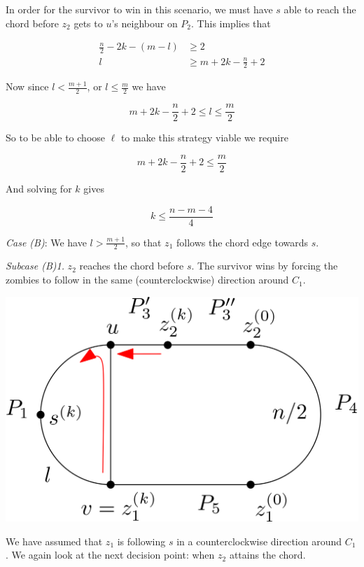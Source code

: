 \documentclass[letterpaper, 10pt]{article}
\begin{document}
\begin{enumerate}
       In order for the survivor to win in this scenario, we must have $s$ able to
       reach the chord before $z_2$ gets to $u$'s neighbour on $P_2$. This implies that

       \begin{align*}
        \frac{n}{2} - 2k - (m-l) & \geq 2                        \\
        l                        & \geq m + 2k - \frac{n}{2} + 2
       \end{align*}

       Now since $l < \frac{m+1}{2}$, or $l \leq \frac{m}{2}$ we have

       \[ m+2k-\frac{n}{2} +2 \leq l \leq \frac{m}{2} \]

       So to be able to choose $\ell$ to make this strategy viable we require

       \[ m+2k-\frac{n}{2} +2 \leq \frac{m}{2} \]

       And solving for $k$ gives

       \[ k \leq \frac{n-m-4}{4} \]

       \emph{Case (B)}: We have $l > \frac{m+1}{2}$, so that $z_1$ follows the chord edge towards $s$.

       \emph{Subcase (B)1.} $z_2$ reaches the chord before $s$. The survivor wins by forcing
       the zombies to follow in the same (counterclockwise) direction around $C_1$.

       \begin{center}
        \includegraphics[scale=0.15]{diagramCaseB1_1}
       \end{center}

       We have assumed that $z_1$ is following $s$ in a counterclockwise direction around $C_1$. We again
       look at the next decision point: when $z_2$ attains the chord.


\end{enumerate}
\end{document}
